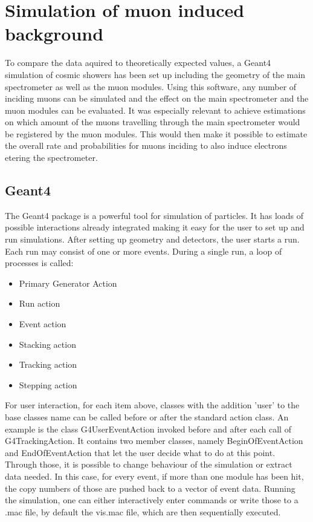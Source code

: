 
\chapter{Simulation of muon induced background}
\label{ch:Simulation of muon induced background}
  To compare the data aquired to theoretically expected values, a Geant4 simulation of cosmic showers has been set up including the geometry of the main spectrometer as well as the muon modules. Using this software, any number of inciding muons can be simulated and the effect on the main spectrometer and the muon modules can be evaluated. It was especially relevant to achieve estimations on which amount of the muons travelling through the main spectrometer would be registered by the muon modules. This would then make it possible to estimate the overall rate and probabilities for muons inciding to also induce electrons etering the spectrometer.
  \section{Geant4}
  \label{ch:Simulation software:sec:Geant4}
  The Geant4 package is a powerful tool for simulation of particles. It has loads of possible interactions already integrated making it easy for the user to set up and run simulations. After setting up geometry and detectors, the user starts a run. Each run may consist of one or more events. During a single run, a loop of processes is called:
  \begin{itemize}	
  	\item Primary Generator Action
  	\item Run action
  	\item Event action
  	\item Stacking action
  	\item Tracking action
  	\item Stepping action
  \end{itemize}
  For user interaction, for each item above, classes with the addition 'user' to the base classes name can be called before or after the standard action class. An example is the class G4UserEventAction invoked before and after each call of G4TrackingAction. It contains two member classes, namely BeginOfEventAction and EndOfEventAction that let the user decide what to do at this point. Through those, it is possible to change behaviour of the simulation or extract data needed. In this case, for every event, if more than one module has been hit, the copy numbers of those are pushed back to a vector of event data.  
  Running the simulation, one can either interactively enter commands or write those to a .mac file, by default the vis.mac file, which are then sequentially executed.
  


